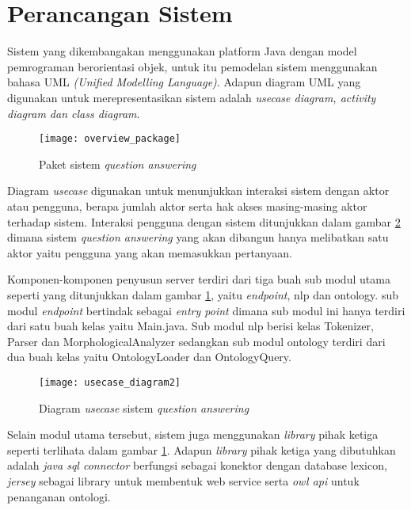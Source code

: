 \section{Perancangan Sistem}
Sistem yang dikembangakan menggunakan platform Java dengan model pemrograman berorientasi objek, untuk itu pemodelan sistem menggunakan bahasa UML \emph{(Unified Modelling Language)}. Adapun diagram UML yang digunakan untuk merepresentasikan sistem adalah \emph{usecase diagram, activity diagram dan class diagram}.

\begin{figure}[th]
    \centering
    \texttt{[image: overview\_package]}
    \caption{Paket sistem \emph{question answering}}
    \label{fig:overview_package}
\end{figure}

Diagram \emph{usecase} digunakan untuk menunjukkan interaksi sistem dengan aktor atau pengguna, berapa jumlah aktor serta hak akses masing-masing aktor terhadap sistem. Interaksi pengguna dengan sistem ditunjukkan dalam gambar \ref{fig:usecase_diagram} dimana sistem \emph{question answering} yang akan dibangun hanya melibatkan satu aktor yaitu pengguna yang akan memasukkan pertanyaan.

Komponen-komponen penyusun server terdiri dari tiga buah sub modul utama seperti yang ditunjukkan dalam gambar \ref{fig:overview_package}, yaitu \emph{endpoint}, nlp dan ontology. sub modul \emph{endpoint} bertindak sebagai \emph{entry point} dimana sub modul ini hanya terdiri dari satu buah kelas yaitu Main.java. Sub modul nlp berisi kelas Tokenizer, Parser dan MorphologicalAnalyzer sedangkan sub modul ontology terdiri dari dua buah kelas yaitu OntologyLoader dan OntologyQuery.

\begin{figure}[ht]
    \centering
    \texttt{[image: usecase\_diagram2]}
    \caption{Diagram \emph{usecase} sistem \emph{question answering}}
    \label{fig:usecase_diagram}
\end{figure}

Selain modul utama tersebut, sistem juga menggunakan \emph{library} pihak ketiga seperti terlihata dalam gambar \ref{fig:overview_package}. Adapun \emph{library} pihak ketiga yang dibutuhkan adalah \emph{java sql connector} berfungsi sebagai konektor dengan database lexicon, \emph{jersey} sebagai library untuk membentuk web service serta \emph{owl api} untuk penanganan ontologi.

